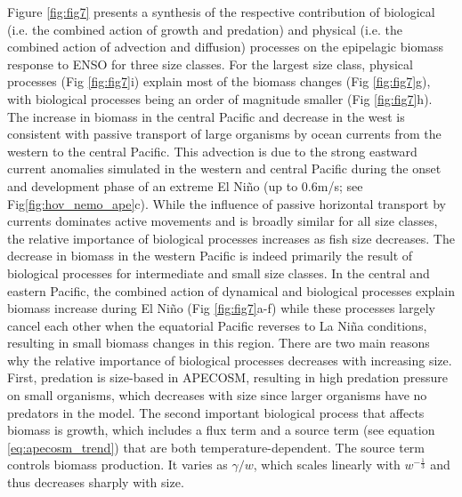 Figure \ref{fig:fig7} presents a synthesis of the respective contribution of biological (i.e. the combined action of growth and predation) and physical (i.e. the combined action of advection and diffusion) processes on the epipelagic biomass response to ENSO for three size classes. For the largest size class, physical processes (Fig \ref{fig:fig7}i) explain most of the biomass changes (Fig \ref{fig:fig7}g), with biological processes being an order of magnitude smaller (Fig \ref{fig:fig7}h). The increase in biomass in the central Pacific and decrease in the west is consistent with passive transport of large organisms by ocean currents from the western to the central Pacific. This advection is due to the strong eastward current anomalies simulated in the western and central Pacific during the onset and development phase of an extreme El Niño (up to 0.6m/s; see Fig\ref{fig:hov_nemo_ape}c). While the influence of passive horizontal transport by currents dominates active movements and is broadly similar for all size classes, the relative importance of biological processes increases as fish size decreases. The decrease in biomass in the western Pacific is indeed primarily the result of biological processes for intermediate and small size classes. In the central and eastern Pacific, the combined action of dynamical and biological processes explain biomass increase during El Niño (Fig \ref{fig:fig7}a-f) while these processes largely cancel each other when the equatorial Pacific reverses to La Niña conditions, resulting in small biomass changes in this region. There are two main reasons why the relative importance of biological processes decreases with increasing size. First, predation is size-based in APECOSM, resulting in high predation pressure on small organisms, which decreases with size since larger organisms have no predators in the model. The second important biological process that affects biomass is growth, which includes a flux term and a source term (see equation \ref{eq:apecosm_trend}) that are both temperature-dependent. The source term controls biomass production. It varies as ${\gamma}/{w}$, which scales linearly with $w^{-\frac{1}{3}}$ and thus decreases sharply with size.


